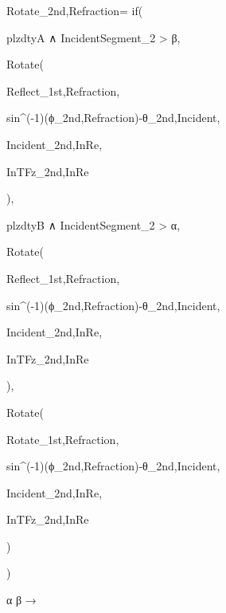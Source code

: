 Rotate_{2nd,Refraction}=
  if(

    plzdtyA ∧ IncidentSegment_2 > β,

    Rotate(

    Reflect_{1st,Refraction},

    sin^(-1)(ϕ_{2nd,Refraction})-θ_{2nd,Incident},

    Incident_{2nd,InRe},

    InTFz_{2nd,InRe}
    
    ),

    plzdtyB ∧ IncidentSegment_2 > α,

    Rotate(

    Reflect_{1st,Refraction},

    sin^(-1)(ϕ_{2nd,Refraction})-θ_{2nd,Incident},

    Incident_{2nd,InRe},

    InTFz_{2nd,InRe}
    
    ),

    Rotate(

    Rotate_{1st,Refraction},

    sin^(-1)(ϕ_{2nd,Refraction})-θ_{2nd,Incident},

    Incident_{2nd,InRe},

    InTFz_{2nd,InRe}
    
    )
  
  )


α
β
→
